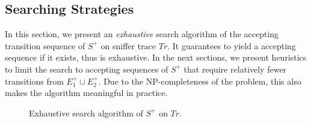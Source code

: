 \subsection{Searching Strategies}
\label{subsec:search}

In this section, we present an \textit{exhaustive} search algorithm of the
accepting transition sequence of $S^+$ on sniffer trace $Tr$. It guarantees to
yield a accepting sequence if it exists, thus is exhaustive.  In the next
sections, we present heuristics to limit the search to accepting sequences of
$S^+$ that require relatively fewer transitions from $E^+_1 \cup E^+_2$.  Due to
the NP-completeness of the problem, this also makes the algorithm meaningful in
practice.

\begin{figure}[t!]
  \begin{minipage}{\textwidth}
    \begin{algorithm}[H]
      \caption{Exhaustive search algorithm of $S^+$ on $Tr$.}
      \label{alg:search}
      

\end{algorithm}
\end{minipage}
\end{figure}

